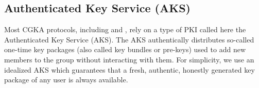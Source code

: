 %
%

\subsection{Authenticated Key Service (AKS)}
Most CGKA protocols, including \protITK and \saik, rely on a type of PKI called here the Authenticated Key Service (AKS). The AKS authentically distributes so-called one-time key packages (also called key bundles or pre-keys) used to add new members to the group without interacting with them. For simplicity, we use an idealized AKS which guarantees that a fresh, authentic, honestly generated key package of any user is always available. %


